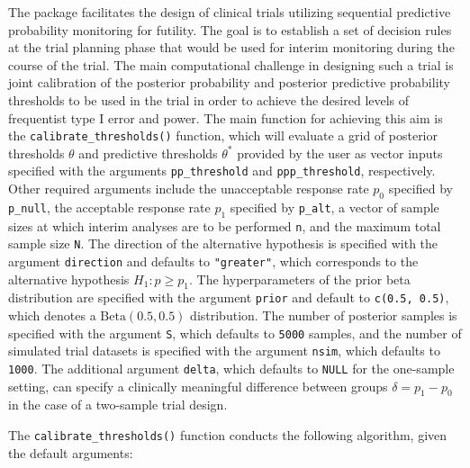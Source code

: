 The  package facilitates the design of clinical trials utilizing sequential predictive probability monitoring for futility. The goal is to establish a set of decision rules at the trial planning phase that would be used for interim monitoring during the course of the trial. The main computational challenge in designing such a trial is joint calibration of the posterior probability and posterior predictive probability thresholds to be used in the trial in order to achieve the desired levels of frequentist type I error and power. The main function for achieving this aim is the \texttt{calibrate\_thresholds()} function, which will evaluate a grid of posterior thresholds \(\theta\) and predictive thresholds \(\theta^*\) provided by the user as vector inputs specified with the arguments \texttt{pp\_threshold} and \texttt{ppp\_threshold}, respectively. Other required arguments include the unacceptable response rate \(p_0\) specified by \texttt{p\_null}, the acceptable response rate \(p_1\) specified by \texttt{p\_alt}, a vector of sample sizes at which interim analyses are to be performed \texttt{n}, and the maximum total sample size \texttt{N}. The direction of the alternative hypothesis is specified with the argument \texttt{direction} and defaults to \texttt{"greater"}, which corresponds to the alternative hypothesis \(H_1: p \geq p_1\). The hyperparameters of the prior beta distribution are specified with the argument \texttt{prior} and default to \texttt{c(0.5,\ 0.5)}, which denotes a \(\mbox{Beta}(0.5, 0.5)\) distribution. The number of posterior samples is specified with the argument \texttt{S}, which defaults to \texttt{5000} samples, and the number of simulated trial datasets is specified with the argument \texttt{nsim}, which defaults to \texttt{1000}. The additional argument \texttt{delta}, which defaults to \texttt{NULL} for the one-sample setting, can specify a clinically meaningful difference between groups \(\delta = p_1 - p_0\) in the case of a two-sample trial design.

The \texttt{calibrate\_thresholds()} function conducts the following algorithm, given the default arguments:

